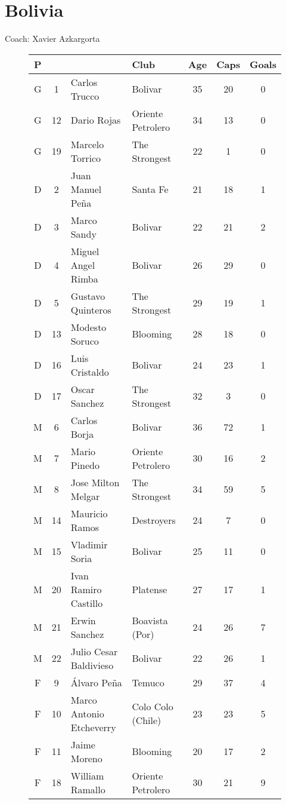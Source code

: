 \chapter{Bolivia}
\newline
\newline
Coach: Xavier Azkargorta
\begin{figure}[H]
\begin{tabular}{c c l l c c c}
P & & & Club & Age & Caps & Goals \\ \hline
G & 1 & Carlos Trucco & Bolivar &  35 & 20 & 0 \\
G & 12 & Dario Rojas & Oriente Petrolero & 34 & 13 & 0 \\
G & 19 & Marcelo Torrico & The Strongest & 22 & 1 & 0 \\ \hline
D & 2 & Juan Manuel Pe{\~n}a & Santa Fe & 21 & 18 & 1 \\
D & 3 & Marco Sandy & Bolivar & 22 & 21 & 2 \\
D & 4 & Miguel Angel Rimba & Bolivar & 26 & 29 & 0 \\
D & 5 & Gustavo Quinteros & The Strongest & 29 & 19 & 1 \\
D & 13 & Modesto Soruco & Blooming & 28 & 18 & 0 \\
D & 16 & Luis Cristaldo & Bolivar & 24 & 23 & 1 \\
D & 17 & Oscar Sanchez & The Strongest & 32 & 3 & 0 \\ \hline
M & 6 & Carlos Borja & Bolivar & 36 & 72 & 1 \\
M & 7 & Mario Pinedo & Oriente Petrolero & 30 & 16 & 2 \\
M & 8 & Jose Milton Melgar & The Strongest & 34 & 59 & 5 \\
M & 14 & Mauricio Ramos & Destroyers & 24 & 7 & 0 \\
M & 15 & Vladimir Soria & Bolivar & 25 & 11 & 0 \\
M & 20 & Ivan Ramiro Castillo & Platense & 27 & 17 & 1 \\
M & 21 & Erwin Sanchez & Boavista (Por) & 24 & 26 & 7 \\
M & 22 & Julio Cesar Baldivieso & Bolivar & 22 & 26 & 1 \\ \hline
F & 9 & {\'A}lvaro Pe{\~n}a & Temuco & 29 & 37 & 4 \\
F & 10 & Marco Antonio Etcheverry & Colo Colo (Chile) & 23 & 23 & 5 \\
F & 11 & Jaime Moreno & Blooming & 20 & 17 & 2 \\
F & 18 & William Ramallo & Oriente Petrolero & 30 & 21 & 9 \\ \hline
\end{tabular}
\end{figure}
